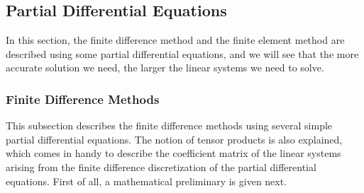 \subsection{{Partial Differential Equations}}\label{sec:partial-differential-equations}
{In this section, the finite difference method and the finite element method are described using some partial differential equations, and we will see that the more accurate solution we need, the larger the linear systems we need to solve.}
\subsubsection{{Finite Difference Methods}}\label{subsec:finite-differences}
{This subsection describes the finite difference methods using several simple partial differential equations. The notion of tensor products is also explained, which comes in handy to describe the coefficient matrix of the linear systems arising from the finite difference discretization of the partial differential equations. First of all, a mathematical preliminary is given next.}
